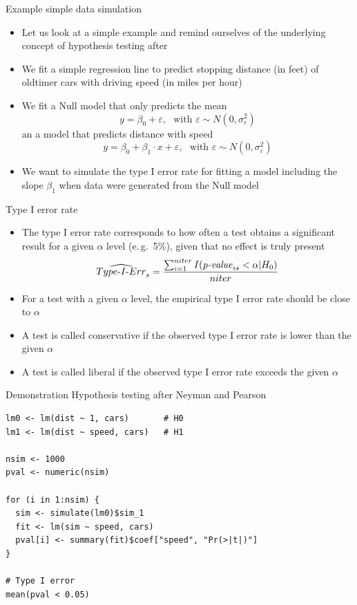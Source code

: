 \documentclass[aspectratio=169]{beamer}
\begin{document}
\begin{frame}{Example simple data simulation}
  \begin{itemize}
    \item Let us look at a simple example and remind ourselves of the underlying
      concept of hypothesis testing after \citet{NeymanPearson33}
    \item We fit a simple regression line to predict stopping distance (in feet)
      of oldtimer cars with driving speed (in miles per hour)
    \item We fit a Null model that only predicts the mean
      \[
        y = \beta_0 + \varepsilon, ~~~\text{with } \varepsilon \sim N(0,
        \sigma^2_{\varepsilon})
      \]
      an a model that predicts distance with speed
      \[
        y = \beta_0 + \beta_1 \cdot x + \varepsilon, ~~~\text{with } \varepsilon
        \sim N(0, \sigma^2_{\varepsilon})
      \]
    \item We want to simulate the type I error rate for fitting a model
      including the slope $\beta_1$ when data were generated from the Null model
  \end{itemize}
\end{frame}

\begin{frame}{Type I error rate}
\begin{itemize}
  \item The type I error rate corresponds to how often a test obtains a
    significant result for a given $\alpha$ level (e.\,g.~5\%), given that no
    effect is truly present
\vspace{0.4cm}
\begin{equation*}
\widehat{\text{$Type$-$I$-$Err$}}_s = \frac{\sum_{i = 1}^{niter} I(\mbox{\emph{p-value}}_{is} < \alpha | H_0)}{niter}
\end{equation*}
  \item For a test with a given $\alpha$ level, the empirical type I error rate
    should be close to $\alpha$
  \item A test is called conservative if the observed type I error rate is lower
    than the given $\alpha$
  \item A test is called liberal if the observed type I error rate exceeds the
    given $\alpha$
\end{itemize}
\end{frame}

\begin{frame}[fragile]{Demonstration}
  {Hypothesis testing after Neyman and Pearson}
\begin{lstlisting}
lm0 <- lm(dist ~ 1, cars)       # H0
lm1 <- lm(dist ~ speed, cars)   # H1

nsim <- 1000
pval <- numeric(nsim)

for (i in 1:nsim) {
  sim <- simulate(lm0)$sim_1
  fit <- lm(sim ~ speed, cars)
  pval[i] <- summary(fit)$coef["speed", "Pr(>|t|)"]
}

# Type I error
mean(pval < 0.05)
\end{lstlisting}
\end{frame}
\end{document}
